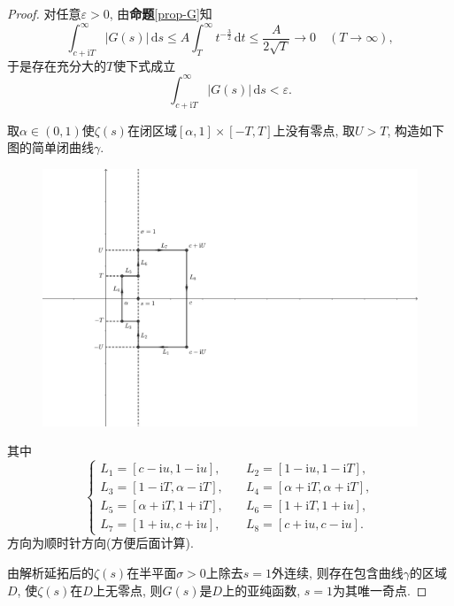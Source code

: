 \documentclass[12pt, a4paper, oneside]{ctexart}
\numberwithin{equation}{section}  %
\let\leq=\leqslant %
\let\epsilon=\varepsilon %
\def\d{\mathrm{d}}          %
\def\i{\mathrm{i}}          %
\begin{document}
\begin{proof}
    对任意$\epsilon > 0$, 由\textbf{命题}\ref{prop-G}知
    \begin{equation*}
        \int_{c+\i T}^\infty|G(s)|\,\d s\leq A\int_{T}^\infty t^{-\frac{3}{2}}\,\d t\leq \frac{A}{2\sqrt{T}}\to 0\quad(T\to\infty),
    \end{equation*}
    于是存在充分大的$T$使下式成立
    \begin{equation*}
    \int_{c+\i T}^\infty|G(s)|\,\d s < \epsilon.
    \end{equation*}

    取$\alpha\in(0,1)$使$\zeta(s)$在闭区域$[\alpha, 1]\times[-T,T]$上没有零点, 取$U > T$, 构造如下图的简单闭曲线$\gamma$.
    \begin{figure}[htbp]
        \centering
        \includegraphics[scale=0.6]{PNT-last.pdf}
    \end{figure}

    其中
    \begin{equation*}
        \begin{cases}
            L_1=[c-\i u,1-\i u],&\quad L_2=[1-\i u,1-\i T],\\
            L_3=[1-\i T,\alpha-\i T],&\quad L_4=[\alpha+\i T,\alpha+\i T],\\
            L_5=[\alpha+\i T,1+\i T],&\quad L_6=[1+\i T, 1+\i u],\\
            L_7=[1+\i u, c+\i u],&\quad L_8=[c+\i u, c-\i u].
        \end{cases}
    \end{equation*}
    方向为顺时针方向(方便后面计算).

    由解析延拓后的$\zeta(s)$在半平面$\sigma > 0$上除去$s=1$外连续, 则存在包含曲线$\gamma$的区域$D$, 使$\zeta(s)$在$D$上无零点, 则$G(s)$是$D$上的亚纯函数, $s=1$为其唯一奇点.


\end{proof}
\end{document}
